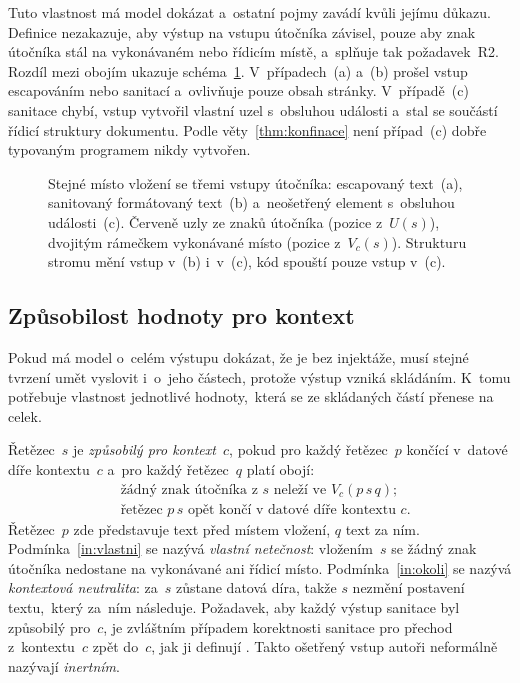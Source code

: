 Tuto vlastnost má model dokázat a~ostatní pojmy zavádí kvůli jejímu důkazu. Definice nezakazuje, aby výstup na vstupu útočníka závisel, pouze aby znak útočníka stál na vykonávaném nebo řídicím místě, a~splňuje tak požadavek~R2. Rozdíl mezi obojím ukazuje schéma~\ref{fig:konfinace}. V~případech~(a) a~(b) prošel vstup escapováním nebo sanitací a~ovlivňuje pouze obsah stránky. V~případě~(c) sanitace chybí, vstup vytvořil vlastní uzel s~obsluhou události a~stal se součástí řídicí struktury dokumentu. Podle věty~\ref{thm:konfinace} není případ~(c) dobře typovaným programem nikdy vytvořen.

\begin{figure}[htbp]
    \centering
    \caption[Tři vstupy útočníka ve stromu dokumentu]{Stejné místo vložení se třemi vstupy útočníka: escapovaný text~(a), sanitovaný formátovaný text~(b) a~neošetřený element s~obsluhou události~(c). Červeně uzly ze znaků útočníka (pozice z~$U(s)$), dvojitým rámečkem vykonávané místo (pozice z~$V_c(s)$). Strukturu stromu mění vstup v~(b) i~v~(c), kód spouští pouze vstup v~(c).}
    \label{fig:konfinace}
\end{figure}

\subsection{Způsobilost hodnoty pro kontext}
\label{sec:model-inertnost}

Pokud má model o~celém výstupu dokázat, že je bez injektáže, musí stejné tvrzení umět vyslovit i~o~jeho částech, protože výstup vzniká skládáním. K~tomu potřebuje vlastnost jednotlivé hodnoty,~která se ze skládaných částí přenese na celek.

\begin{definice}
\label{def:inertnost}
Řetězec~$s$ je \emph{způsobilý pro kontext~$c$}, pokud pro každý řetězec~$p$ končící v~datové díře kontextu~$c$ a~pro každý řetězec~$q$ platí obojí:
\begin{align}
    &\text{žádný znak útočníka z~}s\text{ neleží ve~}V_c(p\,s\,q)\text{;}
    \tag{P1} \label{in:vlastni}\\[2pt]
    &\text{řetězec~}p\,s\text{ opět končí v~datové díře kontextu~}c\text{.}
    \tag{P2} \label{in:okoli}
\end{align}
Řetězec~$p$ zde představuje text před místem vložení, $q$ text za ním. Podmínka~\eqref{in:vlastni} se nazývá \emph{vlastní netečnost}: vložením~$s$ se žádný znak útočníka nedostane na vykonávané ani řídicí místo. Podmínka~\eqref{in:okoli} se nazývá \emph{kontextová neutralita}: za~$s$ zůstane datová díra, takže $s$ nezmění postavení textu,~který za~ním následuje. Požadavek, aby každý výstup sanitace byl způsobilý pro~$c$, je zvláštním případem korektnosti sanitace pro přechod z~kontextu~$c$ zpět do~$c$, jak ji definují \textcite{samuel2011context}. Takto ošetřený vstup autoři neformálně nazývají \emph{inertním}.
\end{definice}

